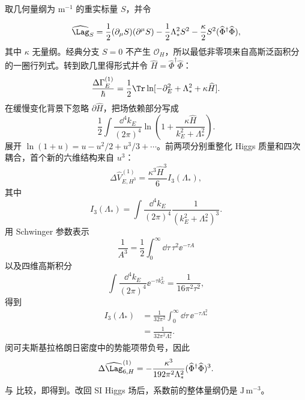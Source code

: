 \begin{derivation}
取几何量纲为 $\mathrm{m^{-1}}$ 的重实标量 $S$，并令

\begin{equation*}
\widehat\Lag_S
=\frac12(\partial_\mu S)(\partial^\mu S)
-\frac12\Lambda_*^2S^2
-\frac\kappa2S^2(\widehat\Phi^\dagger\widehat\Phi),
\end{equation*}
其中 $\kappa$ 无量纲。经典分支 $S=0$ 不产生 $\mathcal O_H$，所以最低非零项来自高斯泛函积分的一圈行列式。转到欧几里得形式并令 $\widehat H=\widehat\Phi^\dagger\widehat\Phi$：
\begin{equation*}
\frac{\Delta\Gamma_E^{(1)}}{\hbar}
=\frac12\Tr\ln[-\partial_E^2+\Lambda_*^2+\kappa\widehat H].
\end{equation*}
在缓慢变化背景下忽略 $\partial\widehat H$，把场依赖部分写成
\begin{equation*}
\frac12\int\frac{\dd^4 k_E}{(2\pi)^4}
\ln\!\left(1+\frac{\kappa\widehat H}{k_E^2+\Lambda_*^2}\right).
\end{equation*}
展开 $\ln(1+u)=u-u^2/2+u^3/3+\cdots$。前两项分别重整化 Higgs 质量和四次耦合，首个新的六维结构来自 $u^3$：
\begin{equation*}
\Delta\widehat V_{E,H^3}^{(1)}
=\frac{\kappa^3\widehat H^3}{6}I_3(\Lambda_*),
\end{equation*}
其中
\begin{equation*}
I_3(\Lambda_*)
=\int\frac{\dd^4 k_E}{(2\pi)^4}\frac1{(k_E^2+\Lambda_*^2)^3}.
\end{equation*}
用 Schwinger 参数表示
\begin{equation*}
\frac1{A^3}=\frac12\int_0^\infty\dd\tau\,\tau^2\ee^{-\tau A}
\end{equation*}
以及四维高斯积分
\begin{equation*}
\int\frac{\dd^4 k_E}{(2\pi)^4}\ee^{-\tau k_E^2}
=\frac1{16\pi^2\tau^2},
\end{equation*}
得到
\begin{align*}
I_3(\Lambda_*)
&=\frac1{32\pi^2}\int_0^\infty\dd\tau\,\ee^{-\tau\Lambda_*^2}\\
&=\frac1{32\pi^2\Lambda_*^2}.
\end{align*}
闵可夫斯基拉格朗日密度中的势能项带负号，因此
\begin{equation*}
\Delta\widehat\Lag_{6,H}^{(1)}
=-\frac{\kappa^3}{192\pi^2\Lambda_*^2}
(\widehat\Phi^\dagger\widehat\Phi)^3.
\end{equation*}
与 比较，即得到。改回 SI Higgs 场后，系数前的整体量纲仍是 $\mathrm{J\,m^{-3}}$。
\end{derivation}

